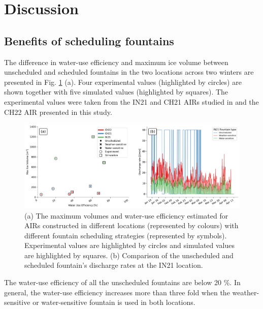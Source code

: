 \documentclass[tc, manuscript]{copernicus}
\begin{document}
\section{Discussion}

\subsection{Benefits of scheduling fountains}

The difference in water-use efficiency and maximum ice volume between unscheduled and scheduled fountains in the two
locations across two winters are presented in Fig. \ref{fig:wue} (a). Four experimental values (highlighted by
circles) are shown together with five simulated values (highlighted by squares).  The experimental values were
taken from the IN21 and CH21 AIRs studied in \citet{balasubramanianInfluenceMeteorologicalConditions2022} and
the CH22 AIR presented in this study. 

\begin{figure}[t]
\includegraphics[width=\textwidth]{Figures/wue.png}

\caption{(a) The maximum volumes and water-use efficiency estimated for AIRs constructed in different locations
(represented by colours) with different fountain scheduling strategies (represented by symbols). Experimental
values are highlighted by circles and simulated values are highlighted by squares. (b) Comparison of
the unscheduled and scheduled fountain's discharge rates at the IN21 location.}

\label{fig:wue}
\end{figure}

The water-use efficiency of all the unscheduled fountains are below 20 \%. In general, the water-use efficiency
increases more than three fold when the weather-sensitive or water-sensitive fountain is used in both
locations.  
\end{document}
